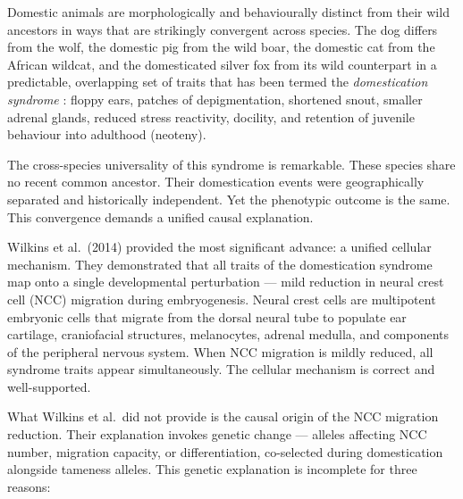 \documentclass[11pt, a4paper]{article}
\begin{document}
Domestic animals are morphologically and behaviourally
distinct from their wild ancestors in ways that are
strikingly convergent across species. The dog differs
from the wolf, the domestic pig from the wild boar,
the domestic cat from the African wildcat, and the
domesticated silver fox from its wild counterpart in
a predictable, overlapping set of traits that has been
termed the \textit{domestication syndrome}
\cite{wilkins2014}: floppy ears, patches of
depigmentation, shortened snout, smaller adrenal glands,
reduced stress reactivity, docility, and retention of
juvenile behaviour into adulthood (neoteny).

The cross-species universality of this syndrome is
remarkable. These species share no recent common
ancestor. Their domestication events were geographically
separated and historically independent. Yet the phenotypic
outcome is the same. This convergence demands a unified
causal explanation.

Wilkins et al.\ (2014) provided the most significant
advance: a unified cellular mechanism. They demonstrated
that all traits of the domestication syndrome map onto
a single developmental perturbation --- mild reduction in
neural crest cell (NCC) migration during embryogenesis.
Neural crest cells are multipotent embryonic cells that
migrate from the dorsal neural tube to populate ear
cartilage, craniofacial structures, melanocytes, adrenal
medulla, and components of the peripheral nervous system.
When NCC migration is mildly reduced, all syndrome traits
appear simultaneously. The cellular mechanism is correct
and well-supported.

What Wilkins et al.\ did not provide is the causal origin
of the NCC migration reduction. Their explanation invokes
genetic change --- alleles affecting NCC number,
migration capacity, or differentiation, co-selected
during domestication alongside tameness alleles. This
genetic explanation is incomplete for three reasons:
\end{document}
